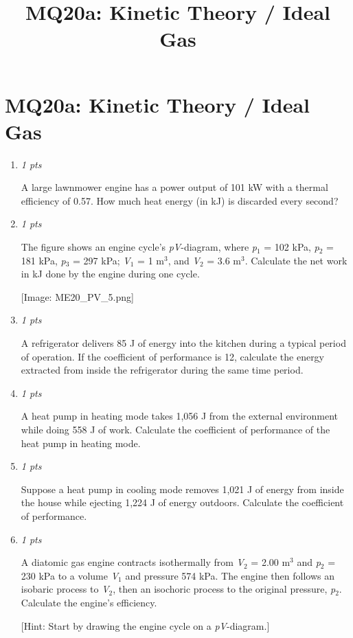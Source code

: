 \documentclass[11pt]{article}
\title{MQ20a: Kinetic Theory / Ideal Gas}
\author{}
\date{}
\begin{document}
\maketitle

\section*{MQ20a: Kinetic Theory / Ideal Gas}

\begin{enumerate}[leftmargin=*,label=\textbf{Question \arabic*.}]

\item \hfill \textit{1 pts}

A large lawnmower engine has a power output of 101 kW with a thermal efficiency of 0.57. How much heat energy (in kJ) is discarded every second?

\item \hfill \textit{1 pts}

The figure shows an engine cycle's \emph{pV}-diagram, where \emph{p}$_{1}$ = 102 kPa, \emph{p}$_{2}$ = 181 kPa, \emph{p}$_{3}$ = 297 kPa; \emph{V}$_{1}$ = 1 m$^{3}$, and \emph{V}$_{2}$ = 3.6 m$^{3}$. Calculate the net work in kJ done by the engine during one cycle.

 [Image: ME20\_PV\_5.png]

\item \hfill \textit{1 pts}

A refrigerator delivers 85 J of energy into the kitchen during a typical period of operation. If the coefficient of performance is 12, calculate the energy extracted from inside the refrigerator during the same time period.

\item \hfill \textit{1 pts}

A heat pump in heating mode takes 1,056 J from the external environment while doing 558 J of work. Calculate the coefficient of performance of the heat pump in heating mode.

\item \hfill \textit{1 pts}

Suppose a heat pump in cooling mode removes 1,021 J of energy from inside the house while ejecting 1,224 J of energy outdoors. Calculate the coefficient of performance.

\item \hfill \textit{1 pts}

A diatomic gas engine contracts isothermally from \emph{V}$_{2}$ = 2.00 m$^{3}$ and \emph{p}$_{2}$ = 230 kPa to a volume \emph{V}$_{1}$ and pressure 574 kPa. The engine then follows an isobaric process to \emph{V}$_{2}$, then an isochoric process to the original pressure, \emph{p}$_{2}$. Calculate the engine's efficiency.

[Hint: Start by drawing the engine cycle on a \emph{pV}-diagram.]

\end{enumerate}
\end{document}
